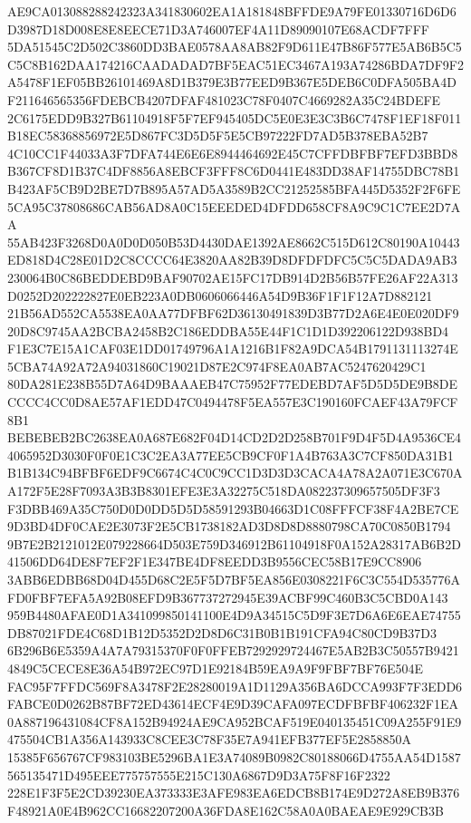 \documentclass[UTF8,fontset=fandol,zihao=-4,a4paper]{ctexart}
\begin{document}
{{AE9CA013088288242323A341830602EA1A181848BFFDE9A79FE01330716D6D6D3987D18D008E8E8EECE71D3A746007EF4A11D89090107E68ACDF7FFF
5DA51545C2D502C3860DD3BAE0578AA8AB82F9D611E47B86F577E5AB6B5C5C5C8B162DAA174216CAADADAD7BF5EAC51EC3467A193A74286BDA7DF9F2
A5478F1EF05BB26101469A8D1B379E3B77EED9B367E5DEB6C0DFA505BA4DF211646565356FDEBCB4207DFAF481023C78F0407C4669282A35C24BDEFE
2C6175EDD9B327B61104918F5F7EF945405DC5E0E3E3C3B6C7478F1EF18F011B18EC58368856972E5D867FC3D5D5F5E5CB97222FD7AD5B378EBA52B7
4C10CC1F44033A3F7DFA744E6E6E8944464692E45C7CFFDBFBF7EFD3BBD8B367CF8D1B37C4DF8856A8EBCF3FFF8C6D0441E483DD38AF14755DBC78B1
B423AF5CB9D2BE7D7B895A57AD5A3589B2CC21252585BFA445D5352F2F6FE5CA95C37808686CAB56AD8A0C15EEEDED4DFDD658CF8A9C9C1C7EE2D7AA
55AB423F3268D0A0D0D050B53D4430DAE1392AE8662C515D612C80190A10443ED818D4C28E01D2C8CCCC64E3820AA82B39D8DFDFDFC5C5C5DADA9AB3
230064B0C86BEDDEBD9BAF90702AE15FC17DB914D2B56B57FE26AF22A313D0252D202222827E0EB223A0DB0606066446A54D9B36F1F1F12A7D882121
21B56AD552CA5538EA0AA77DFBF62D36130491839D3B77D2A6E4E0E020DF920D8C9745AA2BCBA2458B2C186EDDBA55E44F1C1D1D392206122D938BD4
F1E3C7E15A1CAF03E1DD01749796A1A1216B1F82A9DCA54B1791131113274E5CBA74A92A72A94031860C19021D87E2C974F8EA0AB7AC5247620429C1
80DA281E238B55D7A64D9BAAAEB47C75952F77EDEBD7AF5D5D5DE9B8DECCCC4CC0D8AE57AF1EDD47C0494478F5EA557E3C190160FCAEF43A79FCF8B1
BEBEBEB2BC2638EA0A687E682F04D14CD2D2D258B701F9D4F5D4A9536CE44065952D3030F0F0E1C3C2EA3A77EE5CB9CF0F1A4B763A3C7CF850DA31B1
B1B134C94BFBF6EDF9C6674C4C0C9CC1D3D3D3CACA4A78A2A071E3C670AA172F5E28F7093A3B3B8301EFE3E3A32275C518DA082237309657505DF3F3
F3DBB469A35C750D0D0DD5D5D58591293B04663D1C08FFFCF38F4A2BE7CE9D3BD4DF0CAE2E3073F2E5CB1738182AD3D8D8D8880798CA70C0850B1794
9B7E2B2121012E079228664D503E759D346912B61104918F0A152A28317AB6B2D41506DD64DE8F7EF2F1E347BE4DF8EEDD3B9556CEC58B17E9CC8906
3ABB6EDBB68D04D455D68C2E5F5D7BF5EA856E0308221F6C3C554D535776AFD0FBF7EFA5A92B08EFD9B367737272945E39ACBF99C460B3C5CBD0A143
959B4480AFAE0D1A341099850141100E4D9A34515C5D9F3E7D6A6E6EAE74755DB87021FDE4C68D1B12D5352D2D8D6C31B0B1B191CFA94C80CD9B37D3
6B296B6E5359A4A7A79315370F0F0FFEB7292929724467E5AB2B3C50557B94214849C5CECE8E36A54B972EC97D1E92184B59EA9A9F9FBF7BF76E504E
FAC95F7FFDC569F8A3478F2E28280019A1D1129A356BA6DCCA993F7F3EDD6FABCE0D0262B87BF72ED43614ECF4E9D39CAFA097ECDFBFBF406232F1EA
0A887196431084CF8A152B94924AE9CA952BCAF519E040135451C09A255F91E9475504CB1A356A143933C8CEE3C78F35E7A941EFB377EF5E2858850A
15385F656767CF983103BE5296BA1E3A74089B0982C80188066D4755AA54D1587565135471D495EEE775757555E215C130A6867D9D3A75F8F16F2322
228E1F3F5E2CD39230EA373333E3AFE983EA6EDCB8B174E9D272A8EB9B376F48921A0E4B962CC16682207200A36FDA8E162C58A0A0BAEAE9E929CB3B
}}
\end{document}
